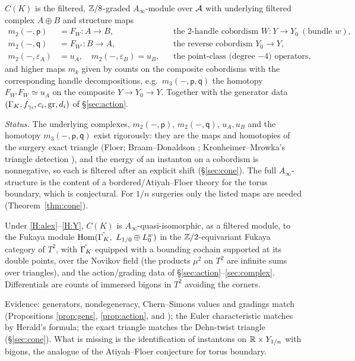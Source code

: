 \begin{definition}\label{def:CK}
$C(K)$ is the filtered, $\mathbb{Z}/8$-graded $A_\infty$-module over $\mathcal{A}$ with underlying filtered complex $A\oplus B$
and structure maps
\begin{align*}
m_2(-,\mathsf p)&=F_W\colon A\to B, &&\text{the $2$-handle cobordism }W\colon Y\to Y_0\ (\text{bundle }w),\\
m_2(-,\mathsf q)&=F_{W'}\colon B\to A, &&\text{the reverse cobordism }Y_0\to Y,\\
m_2(-,\varepsilon_A)&=u_A,\quad m_2(-,\varepsilon_B)=u_B, &&\text{the point-class (degree $-4$) operators},
\end{align*}
and higher maps $m_k$ given by counts on the composite cobordisms with the corresponding handle decompositions,
e.g.\ $m_3(-,\mathsf p,\mathsf q)$ the homotopy $F_{W'}F_W\simeq u_A$ on the composite $Y\to Y_0\to Y$.
Together with the generator data $(\Gamma_K,f_{\gamma_i},c_i,\mathrm{gr},d_i)$ of \S\ref{sec:action}.
\end{definition}

\emph{Status.}  The underlying complexes, $m_2(-,\mathsf p)$, $m_2(-,\mathsf q)$, $u_A,u_B$ and the homotopy
$m_3(-,\mathsf p,\mathsf q)$ exist rigorously: they are the maps and homotopies of the surgery exact triangle
(Floer; Braam--Donaldson \cite{BD}; Kronheimer--Mrowka's triangle detection \cite{KM-unknot}), and the energy
of an instanton on a cobordism is nonnegative, so each is filtered after an explicit shift (\S\ref{sec:cone}).
The full $A_\infty$-structure is the content of a bordered/Atiyah--Floer theory for the torus boundary, which is
conjectural.  For $1/n$ surgeries only the listed maps are needed (Theorem~\ref{thm:cone}).

\begin{conjecture}\label{conj:pillow}
Under \ref{H:alex}--\ref{H:Y}, $C(K)$ is $A_\infty$-quasi-isomorphic, as a filtered module, to the Fukaya module
$\operatorname{Hom}(\tilde{\Gamma_K},\ L_{1/0}\oplus L_0^w)$ in the $\mathbb{Z}/2$-equivariant Fukaya category of $T^2$, with $\tilde{\Gamma_K}$
equipped with a bounding cochain supported at its double points, over the Novikov field (the products $\mu^2$
on $T^2$ are infinite sums over triangles), and the action/grading data of
\S\ref{sec:action}--\ref{sec:complex}.  Differentials are counts of immersed bigons in $T^2$ avoiding the corners.
\end{conjecture}
Evidence: generators, nondegeneracy, Chern--Simons values and gradings match (Propositions \ref{prop:gens},
\ref{prop:action}, and \cite{KKR,Herald}); the Euler characteristic matches by Herald's formula; the exact
triangle matches the Dehn-twist triangle (\S\ref{sec:cone}).  What is missing is the identification of
instantons on $\mathbb{R}\times Y_{1/n}$ with bigons, the analogue of the Atiyah--Floer conjecture for torus boundary.
